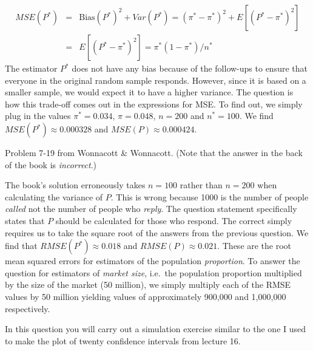 \documentclass[addpoints,12pt]{exam}\usepackage[]{graphicx}\usepackage[]{xcolor}
\begin{document}
\begin{questions}
\begin{solution}
\begin{eqnarray*}
		MSE(P^*)	&=& \mbox{Bias}(P^*)^2 + Var(P^*) = (\pi^* - \pi^*)^2 + E[(P^* - \pi^*)^2]\\
			&=& E[(P^* - \pi^*)^2] = \pi^*(1-\pi^*)/n^*
	\end{eqnarray*}
The estimator $P^*$ does not have any bias because of the follow-ups to ensure that everyone in the original random sample responds. However, since it is based on a smaller sample, we would expect it to have a higher variance. The question is how this trade-off comes out in the expressions for MSE. To find out, we simply plug in the values $\pi^* = 0.034$, $\pi = 0.048$, $n =200$ and $n^* = 100$. We find $MSE(P^*) \approx 0.000328$ and $MSE(P) \approx 0.000424$.
    \end{solution}
    \question Problem 7-19 from Wonnacott \& Wonnacott. (Note that the answer in the back of the book is \emph{incorrect}.)
    \begin{solution}
The book's solution erroneously takes $n=100$ rather than $n = 200$ when calculating the variance of $P$. 
This is wrong because 1000 is the number of people \emph{called} not the number of people who \emph{reply}. 
The question statement specifically states that $P$ should be calculated for those who respond. 
The correct simply requires us to take the square root of the answers from the previous question. 
We find that $RMSE(P^*) \approx 0.018$ and $RMSE(P) \approx 0.021$. These are the root mean squared errors for estimators of the population \emph{proportion}. 
To answer the question for estimators of \emph{market size}, i.e.\ the population proportion multiplied by the size of the market (50 million), we simply multiply each of the RMSE values by 50 million yielding values of approximately 900,000 and 1,000,000 respectively.
    \end{solution}


  \question In this question you will carry out a simulation exercise similar to the one I used to make the plot of twenty confidence intervals from lecture 16.
    \begin{parts}

\end{parts}
\end{questions}
\end{document}
